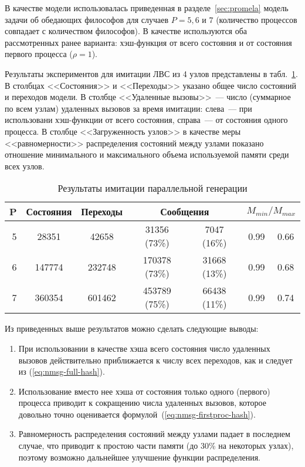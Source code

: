 В качестве модели использовалась приведенная в разделе~\ref{sec:promela} модель задачи об
обедающих философов для случаев $P = 5, 6\text{~и~}7$ (количество процессов совпадает с
количеством философов). В качестве  используются оба рассмотренных ранее
варианта: хэш-функция от всего состояния и от состояния первого процесса ($\rho = 1$).

Результаты экспериментов для имитации ЛВС из 4 узлов представлены в
табл.~\ref{tab:paremu-stats}. В столбцах <<Состояния>> и <<Переходы>> указано общее число
состояний и переходов модели. В столбце <<Удаленные вызовы>>~--- число (суммарное по всем
узлам) удаленных вызовов за время имитации: слева~--- при использовани хэш-функции от
всего состояния, справа~--- от состояния одного процесса. В столбце <<Загруженность
узлов>> в качестве меры <<равномерности>> распределения состояний между узлами показано
отношение минимального и максимального объема используемой памяти среди всех узлов.

\begin{table}[ht]
  \centering
  \caption{Результаты имитации параллельной генерации}
  \begin{tabular}[ht]{|r|c|c|c|c|c|c|}
    \hline
    P & Состояния & Переходы & \multicolumn{2}{|c|}{Сообщения} & \multicolumn{2}{|c|}{$M_{min}/M_{max}$} \\
    \hline
    5 & 28351     & 42658    & 31356  (73\%) & 7047  (16\%) & 0.99 & 0.66 \\ 
    6 & 147774    & 232748   & 170378 (73\%) & 31668 (13\%) & 0.99 & 0.68 \\ 
    7 & 360354    & 601462   & 453789 (75\%) & 66438 (11\%) & 0.99 & 0.74 \\ 
    \hline
  \end{tabular}
  \label{tab:paremu-stats}
\end{table}

Из приведенных выше результатов можно сделать следующие выводы:

\begin{enumerate}
\item При использовании в качестве  хэша всего состояния число
  удаленных вызовов действительно приближается к числу всех переходов, как и
  следует из (\ref{eq:nmsg-full-hash}).

\item Использование вместо нее хэша от состояния только одного (первого) процесса приводит
  к сокращению числа удаленных вызовов, которое довольно точно оценивается
  формулой~(\ref{eq:nmsg-firstproc-hash}).

\item Равномерность распределения состояний между узлами падает в последнем
  случае, что приводит к простою части памяти  (до 30\% на некоторых узлах),
  поэтому возможно дальнейшее улучшение функции распределения.
\end{enumerate}

